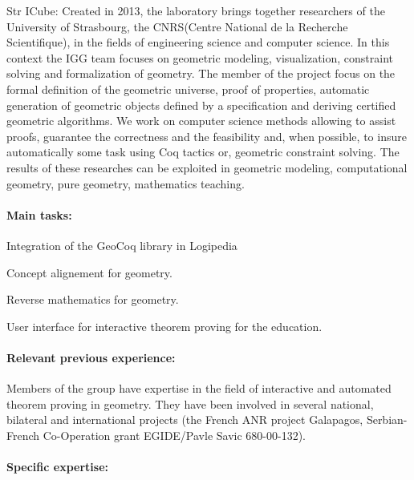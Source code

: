 \begin{sitedescription}{Str}
ICube: Created in 2013, the laboratory brings together researchers of the University of Strasbourg, the CNRS(Centre National de la Recherche Scientifique), in the fields of engineering science and computer science.
In this context the IGG team focuses on geometric modeling, visualization, constraint solving and formalization of geometry. The member of the project focus on the formal definition of the geometric universe, proof of properties, automatic generation of geometric objects defined by a specification and deriving certified geometric algorithms. We work on computer science methods allowing to assist proofs, guarantee the correctness and the feasibility and, when possible, to insure automatically some task using Coq tactics or, geometric constraint solving. The results of these researches can be exploited in geometric modeling, computational geometry, pure geometry, mathematics teaching.

\paragraph{Main tasks:}

\begin{compactitem}
\item{} 
\item Integration of the GeoCoq library in Logipedia
\item Concept alignement for geometry.
\item Reverse mathematics for geometry.
\item User interface for interactive theorem proving for the education.
\end{compactitem}

\paragraph{Relevant previous experience:}


Members of the group have expertise in the field of interactive and automated theorem proving in geometry.
They have been involved in several national, bilateral and international projects (the French ANR project Galapagos, Serbian-French  Co-Operation grant EGIDE/Pavle Savic 680-00-132).


\paragraph{Specific expertise:}


\end{sitedescription}

